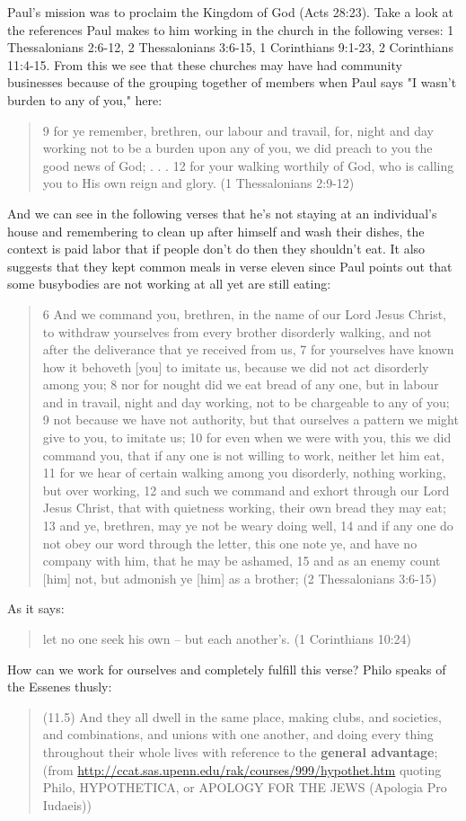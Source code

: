\documentclass[11pt]{article}
\begin{document}
Paul's mission was to proclaim the Kingdom of God (Acts 28:23). Take a look at the references Paul makes to him working in the church in the following verses: 1 Thessalonians 2:6-12, 2 Thessalonians 3:6-15, 1 Corinthians 9:1-23, 2 Corinthians 11:4-15. From this we see that these churches may have had community businesses because of the grouping together of members when Paul says "I wasn't burden to any of you," here:
\begin{quote}
 9 for ye remember, brethren, our labour and travail, for, night and day working not to be a burden upon any of you, we did preach to you the good news of God; . . . 12 for your walking worthily of God, who is calling you to His own reign and glory. (1 Thessalonians 2:9-12) 
\end{quote}
And we can see in the following verses that he's not staying at an individual's house and remembering to clean up after himself and wash their dishes, the context is paid labor that if people don't do then they shouldn't eat. It also suggests that they kept common meals in verse eleven since Paul points out that some busybodies are not working at all yet are still eating:
\begin{quote}
6 And we command you, brethren, in the name of our Lord Jesus Christ, to withdraw yourselves from every brother disorderly walking, and not after the deliverance that ye received from us,
7 for yourselves have known how it behoveth [you] to imitate us, because we did not act disorderly among you;
8 nor for nought did we eat bread of any one, but in labour and in travail, night and day working, not to be chargeable to any of you;
9 not because we have not authority, but that ourselves a pattern we might give to you, to imitate us;
10 for even when we were with you, this we did command you, that if any one is not willing to work, neither let him eat,
11 for we hear of certain walking among you disorderly, nothing working, but over working,
12 and such we command and exhort through our Lord Jesus Christ, that with quietness working, their own bread they may eat;
13 and ye, brethren, may ye not be weary doing well,
14 and if any one do not obey our word through the letter, this one note ye, and have no company with him, that he may be ashamed,
15 and as an enemy count [him] not, but admonish ye [him] as a brother; (2 Thessalonians 3:6-15)
\end{quote}
As it says:
\begin{quote}
let no one seek his own -- but each another's. (1 Corinthians 10:24)
\end{quote}
How can we work for ourselves and completely fulfill this verse? Philo speaks of the Essenes thusly:
\begin{quote}
(11.5) And they all dwell in the same place, making clubs, and societies, and combinations, and unions with one another, and doing every thing throughout their whole lives with reference to the \textbf{general advantage}; (from \url{http://ccat.sas.upenn.edu/rak/courses/999/hypothet.htm} quoting Philo, HYPOTHETICA, or APOLOGY FOR THE JEWS (Apologia Pro Iudaeis)) 
\end{quote}
\end{document}
